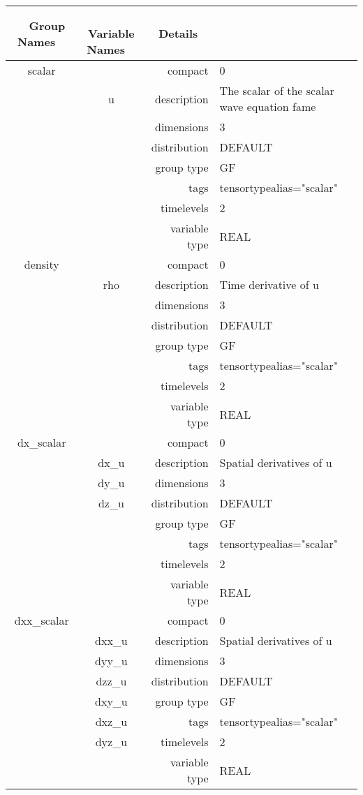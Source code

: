 \documentclass{article}
\begin{document}
\begin{tabular*}{150mm}{|c|c@{\extracolsep{\fill}}|rl|} \hline 
~ {\bf Group Names} ~ & ~ {\bf Variable Names} ~  &{\bf Details} ~ & ~\\ 
\hline 
scalar &  & compact & 0 \\ 
 & u & description & The scalar of the scalar wave equation fame \\ 
 &  & dimensions & 3 \\ 
 &  & distribution & DEFAULT \\ 
 &  & group type & GF \\ 
 &  & tags & tensortypealias="scalar" \\ 
 &  & timelevels & 2 \\ 
 &  & variable type & REAL \\ 
\hline 
density &  & compact & 0 \\ 
 & rho & description & Time derivative of u \\ 
 &  & dimensions & 3 \\ 
 &  & distribution & DEFAULT \\ 
 &  & group type & GF \\ 
 &  & tags & tensortypealias="scalar" \\ 
 &  & timelevels & 2 \\ 
 &  & variable type & REAL \\ 
\hline 
dx\_scalar &  & compact & 0 \\ 
 & dx\_u & description & Spatial derivatives of u \\ 
 & dy\_u & dimensions & 3 \\ 
 & dz\_u & distribution & DEFAULT \\ 
 &  & group type & GF \\ 
 &  & tags & tensortypealias="scalar" \\ 
 &  & timelevels & 2 \\ 
 &  & variable type & REAL \\ 
\hline 
dxx\_scalar &  & compact & 0 \\ 
 & dxx\_u & description & Spatial derivatives of u \\ 
 & dyy\_u & dimensions & 3 \\ 
 & dzz\_u & distribution & DEFAULT \\ 
 & dxy\_u & group type & GF \\ 
 & dxz\_u & tags & tensortypealias="scalar" \\ 
 & dyz\_u & timelevels & 2 \\ 
 &  & variable type & REAL \\ 

\end{tabular*}
\end{document}
